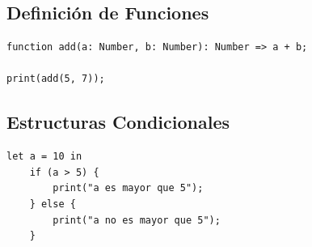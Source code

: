 \documentclass{article}
\begin{document}
\subsection{Definición de Funciones}
\begin{verbatim}
function add(a: Number, b: Number): Number => a + b;

print(add(5, 7));
\end{verbatim}

\subsection{Estructuras Condicionales}
\begin{verbatim}
let a = 10 in
    if (a > 5) {
        print("a es mayor que 5");
    } else {
        print("a no es mayor que 5");
    }
\end{verbatim}
\end{document}
